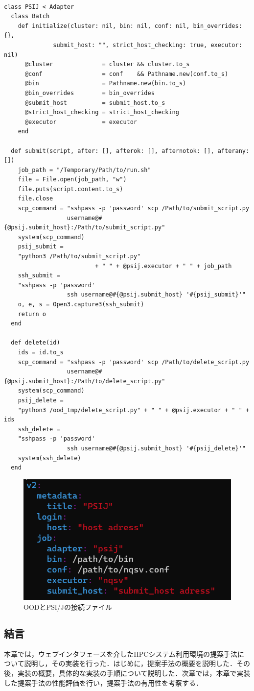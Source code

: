 \begin{lstlisting}[caption=PSI/JとOODの連携, label=psij_to_ood]

class PSIJ < Adapter
  class Batch
    def initialize(cluster: nil, bin: nil, conf: nil, bin_overrides: {}, 
              submit_host: "", strict_host_checking: true, executor: nil)
      @cluster              = cluster && cluster.to_s
      @conf                 = conf    && Pathname.new(conf.to_s)
      @bin                  = Pathname.new(bin.to_s)
      @bin_overrides        = bin_overrides
      @submit_host          = submit_host.to_s
      @strict_host_checking = strict_host_checking
      @executor             = executor
    end

  def submit(script, after: [], afterok: [], afternotok: [], afterany: [])
    job_path = "/Temporary/Path/to/run.sh" 
    file = File.open(job_path, "w")
    file.puts(script.content.to_s)
    file.close
    scp_command = "sshpass -p 'password' scp /Path/to/submit_script.py 
                  username@#{@psij.submit_host}:/Path/to/submit_script.py"
    system(scp_command)
    psij_submit = 
    "python3 /Path/to/submit_script.py" 
                          + " " + @psij.executor + " " + job_path
    ssh_submit = 
    "sshpass -p 'password' 
                  ssh username@#{@psij.submit_host} '#{psij_submit}'"
    o, e, s = Open3.capture3(ssh_submit)
    return o
  end
  
  def delete(id)
    ids = id.to_s
    scp_command = "sshpass -p 'password' scp /Path/to/delete_script.py 
                  username@#{@psij.submit_host}:/Path/to/delete_script.py"
    system(scp_command)
    psij_delete = 
    "python3 /ood_tmp/delete_script.py" + " " + @psij.executor + " " + ids
    ssh_delete = 
    "sshpass -p 'password' 
                  ssh username@#{@psij.submit_host} '#{psij_delete}'"
    system(ssh_delete)
  end

\end{lstlisting}

\begin{figure}[tb]
    \centering
    \includegraphics[width=120mm]{./fig/PSIJ.yml.png}
    \caption{OODとPSI/Jの接続ファイル}
    \label{設定ファイル}
\end{figure}

\subsection{結言}
本章では，ウェブインタフェースを介したHPCシステム利用環境の提案手法について説明し，その実装を行った．はじめに，提案手法の概要を説明した．その後，実装の概要，具体的な実装の手順について説明した．次章では，本章で実装した提案手法の性能評価を行い，提案手法の有用性を考察する．